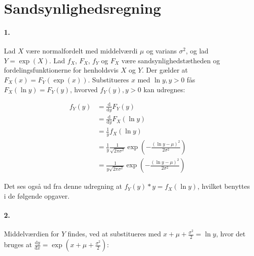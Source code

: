 \section{Sandsynlighedsregning}
\newcommand{\diff}{\mathrm{d}}

\paragraph{1.} Lad $X$ være normalfordelt med middelværdi $\mu$ og varians
$\sigma^2$, og lad $Y=\exp(X)$. Lad $f_X$, $F_X$, $f_Y$ og $F_X$
være sandsynlighedstætheden og fordelingsfunktionerne for henholdsvis $X$ og
$Y$. Der gælder at $F_X(x) = F_Y(\exp(x))$. Substitueres $x$ med $\ln
y, y > 0$ fås $F_X(\ln y) = F_Y(y)$, hvorved $f_Y(y), y > 0$ kan udregnes:

\begin{align*}
f_Y(y) &= \frac{\diff}{\diff y} F_Y(y) \\
&= \frac{\diff}{\diff y} F_X(\ln y) \\
&= \frac{1}{y} f_X(\ln y) \\
&= \frac{1}{y} \frac{1}{\sqrt{2\pi\sigma^2}}\exp\left( -\frac{(\ln y - \mu)^2}{2\sigma^2} \right) \\ 
&= \frac{1}{y\sqrt{2\pi\sigma^2}}\exp\left( -\frac{(\ln y - \mu)^2}{2\sigma^2} \right) 
\end{align*}

Det ses også ud fra denne udregning at $f_Y(y)*y = f_X(\ln y)$, hvilket
benyttes i de følgende opgaver.

\paragraph{2.} Middelværdien for $Y$ findes, ved at substitueres med $x +
\mu + \frac{\sigma^2}{2} = \ln y$, hvor det bruges at $\frac{\diff y}{\diff
x} = \exp(x + \mu + \frac{\sigma^2}{2})$:

